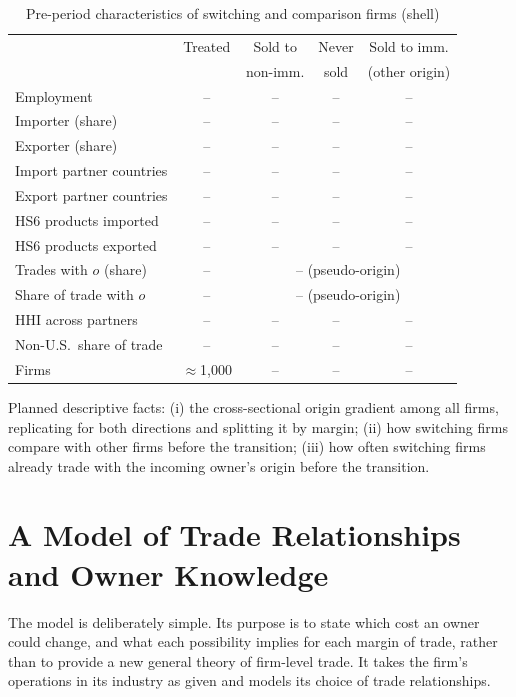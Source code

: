 \documentclass[12pt]{article}
\theoremstyle{remark}
\newcommand{\planned}[1]{\textcolor{OliveGreen}{#1}}
\begin{document}
\begin{table}[htbp]\centering\footnotesize
\caption{Pre-period characteristics of switching and comparison firms (shell)}
\label{tab:sumstats}
\begin{tabular}{lcccc}
\toprule
 & Treated & Sold to & Never & Sold to imm.\\
 & & non-imm. & sold & (other origin)\\
\midrule
Employment & -- & -- & -- & -- \\
Importer (share) & -- & -- & -- & -- \\
Exporter (share) & -- & -- & -- & -- \\
Import partner countries & -- & -- & -- & -- \\
Export partner countries & -- & -- & -- & -- \\
HS6 products imported & -- & -- & -- & -- \\
HS6 products exported & -- & -- & -- & -- \\
Trades with $o$ (share) & -- & \multicolumn{3}{c}{-- (pseudo-origin)} \\
Share of trade with $o$ & -- & \multicolumn{3}{c}{-- (pseudo-origin)} \\
HHI across partners & -- & -- & -- & -- \\
Non-U.S.\ share of trade & -- & -- & -- & -- \\
\midrule
Firms & $\approx$1,000 & -- & -- & -- \\
\bottomrule
\end{tabular}
\end{table}

\planned{Planned descriptive facts: (i) the cross-sectional origin gradient
among all firms, replicating \citet{fungliu2025} for both directions and
splitting it by margin; (ii) how switching firms compare with other firms
before the transition; (iii) how often switching firms already trade with the
incoming owner's origin before the transition.}

\section{A Model of Trade Relationships and Owner Knowledge}
\label{sec:model}

The model is deliberately simple. Its purpose is to state which cost an owner
could change, and what each possibility implies for each margin of trade,
rather than to provide a new general theory of firm-level trade. It takes the
firm's operations in its industry as given and models its choice of trade
relationships.
\end{document}
